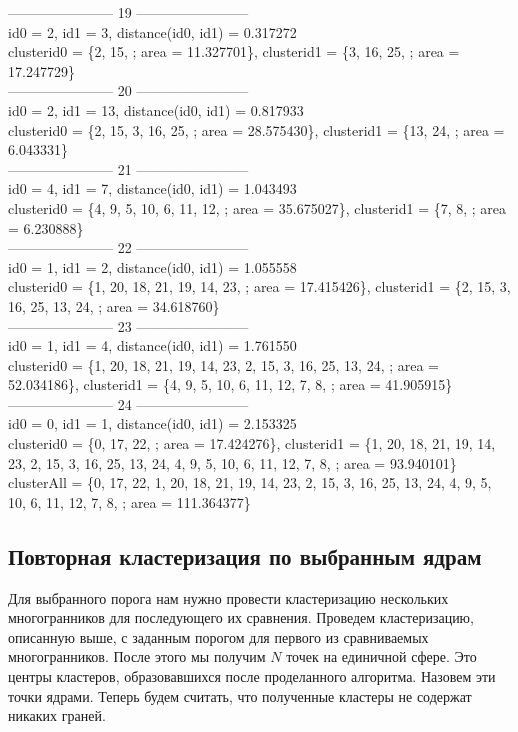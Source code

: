 \documentclass[a4paper,12pt, titlepage]{article}
\begin{document}
\noindent
-----------------------    19    ------------------------\\
id0 = 2, id1 = 3, distance(id0, id1) = 0.317272\\
clusterid0 = \{2, 15, ; area = 11.327701\}, clusterid1 = \{3, 16, 25, ; area = 17.247729\}\\
-----------------------    20    ------------------------\\
id0 = 2, id1 = 13, distance(id0, id1) = 0.817933\\
clusterid0 = \{2, 15, 3, 16, 25, ; area = 28.575430\}, clusterid1 = \{13, 24, ; area = 6.043331\}\\
-----------------------    21    ------------------------\\
id0 = 4, id1 = 7, distance(id0, id1) = 1.043493\\
clusterid0 = \{4, 9, 5, 10, 6, 11, 12, ; area = 35.675027\}, clusterid1 = \{7, 8, ; area = 6.230888\}\\
-----------------------    22    ------------------------\\
id0 = 1, id1 = 2, distance(id0, id1) = 1.055558\\
clusterid0 = \{1, 20, 18, 21, 19, 14, 23, ; area = 17.415426\}, clusterid1 = \{2, 15, 3, 16, 25, 13, 24, ; area = 34.618760\}\\
-----------------------    23    ------------------------\\
id0 = 1, id1 = 4, distance(id0, id1) = 1.761550\\
clusterid0 = \{1, 20, 18, 21, 19, 14, 23, 2, 15, 3, 16, 25, 13, 24, ; area = 52.034186\}, clusterid1 = \{4, 9, 5, 10, 6, 11, 12, 7, 8, ; area = 41.905915\}\\
-----------------------    24    ------------------------\\
id0 = 0, id1 = 1, distance(id0, id1) = 2.153325\\
clusterid0 = \{0, 17, 22, ; area = 17.424276\}, clusterid1 = \{1, 20, 18, 21, 19, 14, 23, 2, 15, 3, 16, 25, 13, 24, 4, 9, 5, 10, 6, 11, 12, 7, 8, ; area = 93.940101\}\\
clusterAll = \{0, 17, 22, 1, 20, 18, 21, 19, 14, 23, 2, 15, 3, 16, 25, 13, 24, 4, 9, 5, 10, 6, 11, 12, 7, 8, ; area = 111.364377\}\\
 
\subsection{Повторная кластеризация по выбранным ядрам}
Для выбранного порога нам нужно провести кластеризацию нескольких многогранников для последующего их сравнения.
Проведем кластеризацию, описанную выше, с заданным порогом для первого из сравниваемых многогранников. 
После этого мы получим $N$ точек на единичной сфере.
Это центры кластеров, образовавшихся после проделанного алгоритма. Назовем эти точки ядрами. Теперь будем считать, что полученные 
кластеры не содержат никаких граней.
\end{document}
